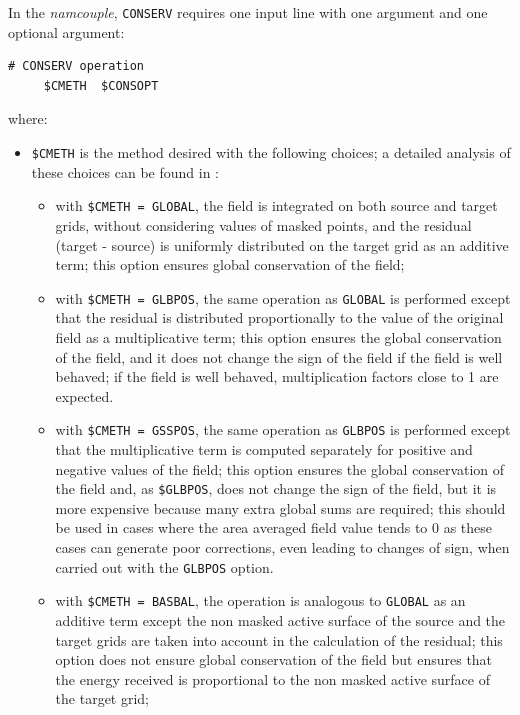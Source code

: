\begin{itemize}
  In the {\it namcouple}, {\tt CONSERV} requires one input line with one argument and one optional argument:

 \begin{verbatim}
# CONSERV operation
     $CMETH  $CONSOPT
\end{verbatim}
  \vspace{-0.5cm} where:
  \begin{itemize}
  \item {\tt \$CMETH} is the method desired with the following choices; a detailed analysis of these choices can be found in \cite{craig19} :
    \begin{itemize}
    \item with {\tt \$CMETH = GLOBAL}, the field is integrated on both
      source and target grids, without considering values of masked
      points, and the residual (target - source) is uniformly
      distributed on the target grid as an additive term; this option ensures global
      conservation of the field;
    \item with {\tt \$CMETH = GLBPOS}, the same operation as {\tt GLOBAL} is performed
      except that the residual is distributed proportionally to the
      value of the original field as a multiplicative term; this option ensures the 
      global conservation of the field, and it does not change the sign of the
      field if the field is well behaved;  if the field is well behaved, multiplication
      factors close to 1 are expected.
    \item with {\tt \$CMETH = GSSPOS}, the same operation as {\tt GLBPOS} is performed
      except that the multiplicative term is computed separately for positive
      and negative values of the field; this option ensures the 
      global conservation of the field and, as {\tt \$GLBPOS}, does not change the sign of the
      field, but it is more expensive because many extra global sums are required; 
      this should be used in cases where the area averaged field value tends to 0
      as these cases can generate poor corrections, even leading
      to changes of sign, when carried out with the {\tt GLBPOS} option.
    \item with {\tt \$CMETH = BASBAL}, the operation is analogous to
      {\tt GLOBAL} as an additive term except the non masked active surface of the source
      and the target grids are taken into account in the calculation
      of the residual; this option does not ensure global conservation
      of the field but ensures that the energy received is
      proportional to the non masked active surface of the target grid;

\end{itemize}
\end{itemize}
\end{itemize}
